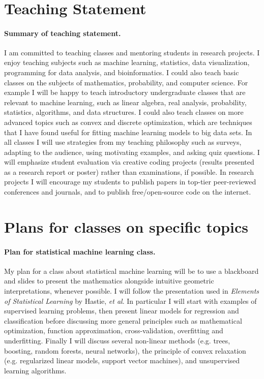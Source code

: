 \documentclass{article}
\begin{document}
 \mbox{ }

\section*{\centering Teaching Statement}

\paragraph{Summary of teaching statement.} I am committed to teaching
classes and mentoring students in research projects. I enjoy teaching
subjects such as machine learning, statistics, data visualization,
programming for data analysis, and bioinformatics. I could also teach
basic classes on the subjects of mathematics, probability, and
computer science. For example I will be happy to teach introductory
undergraduate classes that are relevant to machine learning, such as
linear algebra, real analysis, probability, statistics, algorithms,
and data structures. I could also teach classes on more advanced
topics such as convex and discrete optimization, which are techniques
that I have found useful for fitting machine learning models to big
data sets. In all classes I will use strategies from my teaching
philosophy such as surveys, adapting to the audience, using motivating
examples, and asking quiz questions. I will emphasize student
evaluation via creative coding projects (results presented as a
research report or poster) rather than examinations, if possible. In
research projects I will encourage my students to publish papers in
top-tier peer-reviewed conferences and journals, and to publish
free/open-source code on the internet.

\section{Plans for classes on specific topics}

\paragraph{Plan for statistical machine learning class.} My plan for a
class about statistical machine learning will be to use a blackboard
and slides to present the mathematics alongside intuitive geometric
interpretations, whenever possible. I will follow the presentation
used in \emph{Elements of Statistical Learning} by Hastie, \emph{et
  al}. In particular I will start with examples of supervised learning
problems, then present linear models for regression and classification
before discussing more general principles such as mathematical
optimization, function approximation, cross-validation, overfitting
and underfitting. Finally I will discuss several non-linear methods
(e.g. trees, boosting, random forests, neural networks), the principle
of convex relaxation (e.g. regularized linear models, support vector
machines), and unsupervised learning algorithms.
\end{document}
